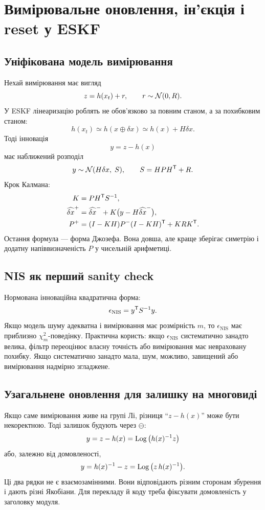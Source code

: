 
\chapter{Вимірювальне оновлення, ін'єкція і reset у ESKF}

\section{Уніфікована модель вимірювання}

Нехай вимірювання має вигляд
\[
z = h(x_t) + r,\qquad r\sim\mathcal{N}(0,R).
\]
У ESKF лінеаризацію роблять не обов'язково за повним станом, а за похибковим станом:
\[
h(x_t) \simeq h(x\oplus\delta x)
\simeq h(x)+H\delta x.
\]
Тоді інновація
\[
y = z-h(x)
\]
має наближений розподіл
\[
y \sim \mathcal{N}(H\delta x,\; S),\qquad S=HPH^{\mathsf{T}}+R.
\]
Крок Калмана:
\begin{align}
K &= PH^{\mathsf{T}} S^{-1},\\
\widehat{\delta x}^{+} &= \widehat{\delta x}^{-}+K\big(y-H\widehat{\delta x}^{-}\big),\\
P^{+} &= (I-KH)P^{-}(I-KH)^{\mathsf{T}} + K R K^{\mathsf{T}}.
\end{align}
Остання формула --- форма Джозефа. Вона довша, але краще зберігає симетрію і додатну напіввизначеність $P$ у чисельній арифметиці.

\section{NIS як перший sanity check}

Нормована інноваційна квадратична форма:
\[
\epsilon_{\mathrm{NIS}} = y^{\mathsf{T}} S^{-1}y.
\]
Якщо модель шуму адекватна і вимірювання має розмірність $m$, то $\epsilon_{\mathrm{NIS}}$ має приблизно $\chi^2_m$-поведінку. Практична користь: якщо $\epsilon_{\mathrm{NIS}}$ систематично занадто велика, фільтр переоцінює власну точність або вимірювання має невраховану похибку. Якщо систематично занадто мала, шум, можливо, завищений або вимірювання надмірно згладжене.

\section{Узагальнене оновлення для залишку на многовиді}

Якщо саме вимірювання живе на групі Лі, різниця ``$z-h(x)$'' може бути некоректною. Тоді залишок будують через $\ominus$:
\[
y = z- h(x) = \operatorname{Log}\big(h(x)^{-1}z\big)
\]
або, залежно від домовленості,
\[
y = h(x)^{-1}- z = \operatorname{Log}\big(z\,h(x)^{-1}\big).
\]
Ці два рядки не є взаємозамінними. Вони відповідають різним сторонам збурення і дають різні Якобіани. Для перекладу й коду треба фіксувати домовленість у заголовку модуля.

